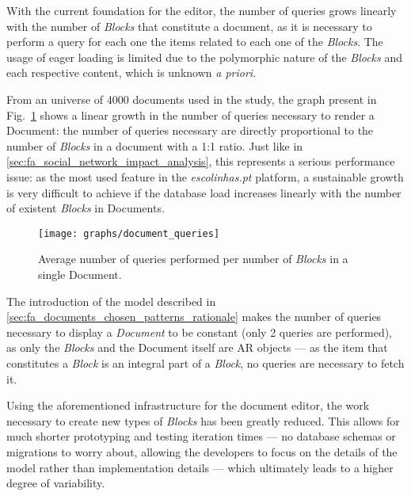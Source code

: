
With the current foundation for the editor, the number of queries grows linearly with the number of \emph{Blocks} that constitute a document, as it is necessary to perform a query for each one the items related to each one of the \emph{Blocks}. The usage of eager loading is limited due to the polymorphic nature of the \emph{Blocks} and each respective content, which is unknown \emph{a priori}.

From an universe of 4000 documents used in the study, the graph present in Fig.~\ref{fig:queries_per_blocks_in_document} shows a linear growth in the number of queries necessary to render a Document: the number of queries necessary are directly proportional to the number of \emph{Blocks} in a document with a 1:1 ratio. Just like in \ref{sec:fa_social_network_impact_analysis}, this represents a serious performance issue: as the most used feature in the \emph{escolinhas.pt} platform, a sustainable growth is very difficult to achieve if the database load increases linearly with the number of existent \emph{Blocks} in Documents.

\begin{figure}[h]
  \centering
  \texttt{[image: graphs/document\_queries]}
  \caption{Average number of queries performed per number of \emph{Blocks} in a single Document.}
  \label{fig:queries_per_blocks_in_document}
\end{figure}

The introduction of the model described in \ref{sec:fa_documents_chosen_patterns_rationale} makes the number of queries necessary to display a \emph{Document} to be constant (only 2 queries are performed), as only the \emph{Blocks} and the Document itself are AR objects --- as the item that constitutes a \emph{Block} is an integral part of a \emph{Block}, no queries are necessary to fetch it.


Using the aforementioned infrastructure for the document editor, the work necessary to create new types of \emph{Blocks} has been greatly reduced. This allows for much shorter prototyping and testing iteration times --- no database schemas or migrations to worry about, allowing the developers to focus on the details of the model rather than implementation details --- which ultimately leads to a higher degree of variability.

